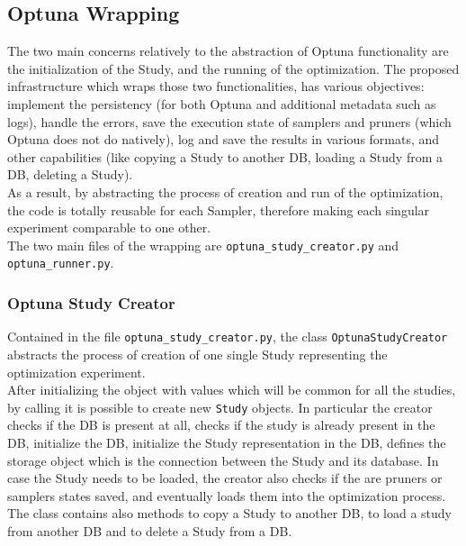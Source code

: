 \subsection{Optuna Wrapping}

The two main concerns relatively to the abstraction of Optuna functionality are the initialization of the Study, and the running of the optimization.
The proposed infrastructure which wraps those two functionalities, has various objectives: implement the persistency (for both Optuna and additional metadata such as logs), handle the errors, save the execution state of samplers and pruners (which Optuna does not do natively), log and save the results in various formats, and other capabilities (like copying a Study to another DB, loading a Study from a DB, deleting a Study).
\\[0.3cm]As a result, by abstracting the process of creation and run of the optimization, the code is totally reusable for each Sampler, therefore making each singular experiment comparable to one other.
\\[0.3cm]The two main files of the wrapping are \texttt{optuna\_study\_creator.py} and \texttt{optuna\_runner.py}.

\subsubsection{Optuna Study Creator}

Contained in the file \texttt{optuna\_study\_creator.py}, the class \texttt{OptunaStudyCreator} abstracts the process of creation of one single Study representing the optimization experiment.
% 
\\[0.3cm]After initializing the object with values which will be common for all the studies, by calling it is possible to create new \texttt{Study} objects.
In particular the creator checks if the DB is present at all, checks if the study is already present in the DB, initialize the DB, initialize the Study representation in the DB, defines the storage object which is the connection between the Study and its database.
In case the Study needs to be loaded, the creator also checks if the are pruners or samplers states saved, and eventually loads them into the optimization process.
% 
\\[0.3cm]The class contains also methods to copy a Study to another DB, to load a study from another DB and to delete a Study from a DB.

